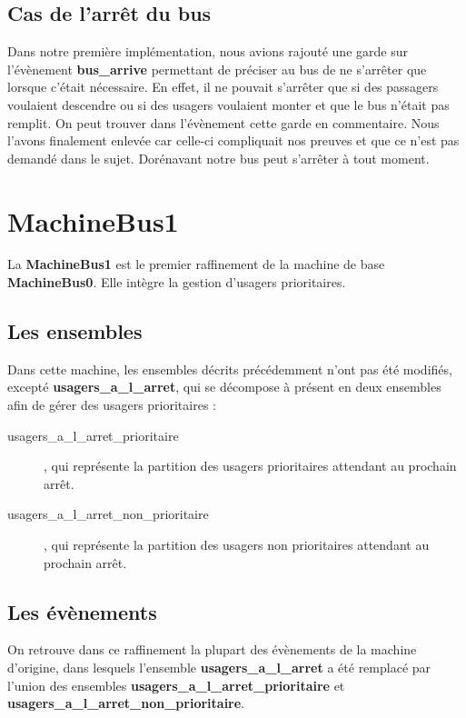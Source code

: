 \documentclass[a4paper,titlepage]{report}
\begin{document}
	\subsection{Cas de l'arrêt du bus}
		Dans notre première implémentation, nous avions rajouté une garde sur l'évènement \textbf{bus\_arrive} permettant de préciser au bus de ne s'arrêter que lorsque c'était nécessaire. En effet, il ne pouvait s'arrêter que si des passagers voulaient descendre ou si des usagers voulaient monter et que le bus n'était pas remplit. On peut trouver dans l'évènement cette garde en commentaire. Nous l'avons finalement enlevée car celle-ci compliquait nos preuves et que ce n'est pas demandé dans le sujet. Dorénavant notre bus peut s'arrêter à tout moment.
	
\newpage
\section{MachineBus1}
	La \textbf{MachineBus1} est le premier raffinement de la machine de base \textbf{MachineBus0}. Elle intègre la gestion d'usagers prioritaires.\\
		
	\subsection{Les ensembles}
		Dans cette machine, les ensembles décrits précédemment n'ont pas été modifiés, excepté \textbf{usagers\_a\_l\_arret}, qui se décompose à présent en deux ensembles afin de gérer des usagers prioritaires :
		 	
		\begin{description}
			\item[usagers\_a\_l\_arret\_prioritaire], qui représente la partition des usagers prioritaires attendant au prochain arrêt.
			\item[usagers\_a\_l\_arret\_non\_prioritaire], qui représente la partition des usagers non prioritaires attendant au prochain arrêt.\\
		\end{description}
				
	\subsection{Les évènements}
		On retrouve dans ce raffinement la plupart des évènements de la machine d'origine, dans lesquels l'ensemble \textbf{usagers\_a\_l\_arret} a été remplacé par l'union des ensembles \textbf{usagers\_a\_l\_arret\_prioritaire} et \textbf{usagers\_a\_l\_arret\_non\_prioritaire}.\\
		
\end{document}
